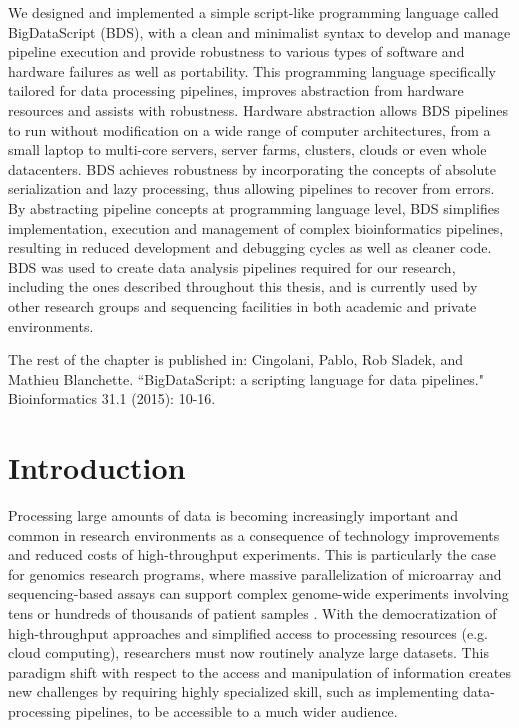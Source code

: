 We designed and implemented a simple script-like programming language called BigDataScript (BDS), with a clean and minimalist syntax to develop and manage pipeline execution and provide robustness to various types of software and hardware failures as well as portability.  This programming language specifically tailored for data processing pipelines, improves abstraction from hardware resources and assists with robustness. Hardware abstraction allows BDS pipelines to run without modification on a wide range of computer architectures, from a small laptop to multi-core servers, server farms, clusters, clouds or even whole datacenters. BDS achieves robustness by incorporating the concepts of absolute serialization and lazy processing, thus allowing pipelines to recover from errors. By abstracting pipeline concepts at programming language level, BDS simplifies implementation, execution and management of complex bioinformatics pipelines, resulting in reduced development and debugging cycles as well as cleaner code. BDS was used to create data analysis pipelines required for our research, including the ones described throughout this thesis, and is currently used by other research groups and  sequencing facilities in both academic and private environments.

The rest of the chapter is published in: Cingolani, Pablo, Rob Sladek, and Mathieu Blanchette. ``BigDataScript: a scripting language for data pipelines." Bioinformatics 31.1 (2015): 10-16.


\section{Introduction}

Processing large amounts of data is becoming increasingly important and common in research environments as a consequence of technology improvements and reduced costs of high-throughput experiments. This is particularly the case for genomics research programs, where massive parallelization of microarray and sequencing-based assays can support complex genome-wide experiments involving tens or hundreds of thousands of patient samples \cite{zuk2014searching}. With the democratization of high-throughput approaches and simplified access to processing resources (e.g. cloud computing), researchers must now routinely analyze large datasets. This paradigm shift with respect to the access and manipulation of information creates new challenges by requiring highly specialized skill, such as implementing data-processing pipelines, to be accessible to a much wider audience.


